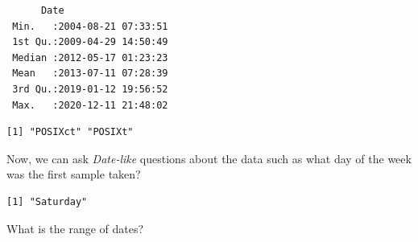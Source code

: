 \documentclass[
  letterpaper,
]{book}
\newenvironment{Shaded}{\begin{snugshade}}{\end{snugshade}}
\newcommand{\AttributeTok}[1]{\textcolor[rgb]{0.40,0.45,0.13}{#1}}
\newcommand{\DecValTok}[1]{\textcolor[rgb]{0.68,0.00,0.00}{#1}}
\newcommand{\FunctionTok}[1]{\textcolor[rgb]{0.28,0.35,0.67}{#1}}
\newcommand{\NormalTok}[1]{\textcolor[rgb]{0.00,0.23,0.31}{#1}}
\newcommand{\OtherTok}[1]{\textcolor[rgb]{0.00,0.23,0.31}{#1}}
\newcommand{\SpecialCharTok}[1]{\textcolor[rgb]{0.37,0.37,0.37}{#1}}
\newcommand{\StringTok}[1]{\textcolor[rgb]{0.13,0.47,0.30}{#1}}
\begin{document}
\begin{Shaded}
\end{Shaded}

\begin{verbatim}
      Date                    
 Min.   :2004-08-21 07:33:51  
 1st Qu.:2009-04-29 14:50:49  
 Median :2012-05-17 01:23:23  
 Mean   :2013-07-11 07:28:39  
 3rd Qu.:2019-01-12 19:56:52  
 Max.   :2020-12-11 21:48:02  
\end{verbatim}

\begin{Shaded}
\end{Shaded}

\begin{verbatim}
[1] "POSIXct" "POSIXt" 
\end{verbatim}

Now, we can ask \emph{Date-like} questions about the data such as what
day of the week was the first sample taken?

\begin{Shaded}
\end{Shaded}

\begin{verbatim}
[1] "Saturday"
\end{verbatim}

What is the range of dates?

\begin{Shaded}
\end{Shaded}
\end{document}
